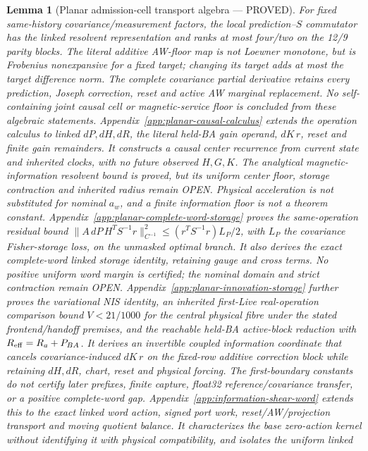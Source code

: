 \documentclass[journal]{IEEEtran}
\newtheorem{lemma}{Lemma}\newtheorem{theorem}{Theorem}\newtheorem{proposition}{Proposition}\newtheorem{remark}{Remark}\newtheorem{corollary}{Corollary}
\begin{document}
\begin{lemma}[Planar admission-cell transport algebra --- PROVED]
For fixed same-history covariance/measurement factors, the local prediction--$S$
commutator has the linked resolvent representation and ranks at most four/two
on the 12/9 parity blocks. The literal additive AW-floor map is not Loewner
monotone, but is Frobenius nonexpansive for a fixed target; changing its target
adds at most the target difference norm. The complete covariance partial
derivative retains every prediction, Joseph correction, reset and active AW
marginal replacement. No self-containing joint causal cell or magnetic-service
floor is concluded from these algebraic statements.
Appendix~\ref{app:planar-causal-calculus} extends the operation calculus to
linked $dP,dH,dR$, the literal held-BA gain operand, $dK\,r$, reset and
finite gain remainders. It constructs a causal center recurrence from current
state and inherited clocks, with no future observed $H,G,K$. The analytical
magnetic-information resolvent bound is proved, but its uniform center floor,
storage contraction and inherited radius remain OPEN. Physical acceleration
is not substituted for nominal $a_w$, and a finite information floor is not
a theorem constant.
Appendix~\ref{app:planar-complete-word-storage} proves the same-operation
residual bound $\|A\,dP\,H^TS^{-1}r\|_{C^{-1}}^2\le
(r^TS^{-1}r)L_P/2$, with $L_P$ the covariance Fisher-storage loss, on the
unmasked optimal branch. It also derives the exact complete-word linked
storage identity, retaining gauge and cross terms. No positive uniform word
margin is certified; the nominal domain and strict contraction remain OPEN.
Appendix~\ref{app:planar-innovation-storage} further proves the variational
NIS identity, an inherited first-Live real-operation comparison bound
$V<21/1000$ for the central physical fibre under the stated frontend/handoff
premises, and the reachable held-BA active-block reduction with
$R_{\rm eff}=R_a+P_{BA}$. It derives an invertible coupled information
coordinate that cancels covariance-induced $dK\,r$ on the fixed-row additive
correction block while retaining $dH,dR$, chart, reset and physical forcing.
The first-boundary constants do not certify later prefixes, finite capture,
float32 reference/covariance transfer, or a positive complete-word gap.
Appendix~\ref{app:information-shear-word} extends this to the exact linked
word action, signed port work, reset/AW/projection transport and moving
quotient balance. It characterizes the base zero-action kernel without
identifying it with physical compatibility, and isolates the uniform linked

\end{lemma}
\end{document}
